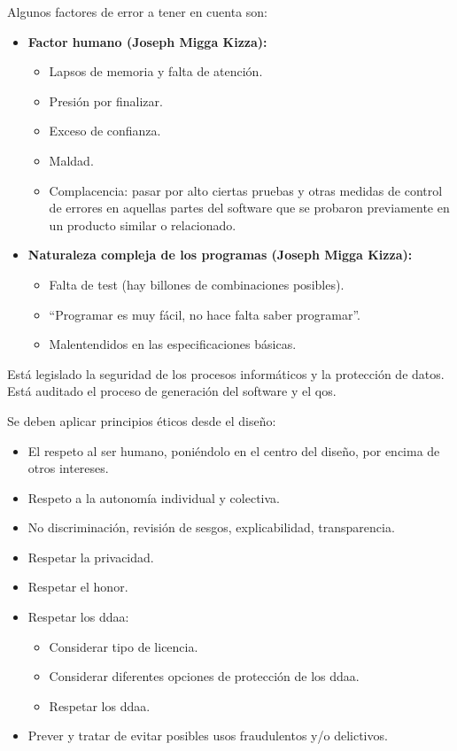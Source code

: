 Algunos factores de error a tener en cuenta son:
\begin{itemize}
    \item\textbf{Factor humano (Joseph Migga Kizza):}
    \begin{itemize}
        \item Lapsos de memoria y falta de atención.
        \item Presión por finalizar.
        \item Exceso de confianza.
        \item Maldad.
        \item Complacencia: pasar por alto ciertas pruebas y otras medidas de control de errores en aquellas partes del software que se probaron previamente en un producto similar o relacionado.
    \end{itemize}
    \item\textbf{Naturaleza compleja de los programas (Joseph Migga Kizza):}
    \begin{itemize}
        \item Falta de test (hay billones de combinaciones posibles).
        \item ``Programar es muy fácil, no hace falta saber programar''.
        \item Malentendidos en las especificaciones básicas.
    \end{itemize}
\end{itemize}

Está legislado la seguridad de los procesos informáticos y la protección de datos. Está auditado el proceso de generación del software y el \gls{qos}.

Se deben aplicar principios éticos desde el diseño:
\begin{itemize}
    \item El respeto al ser humano, poniéndolo en el centro del diseño, por encima de otros intereses.
    \item Respeto a la autonomía individual y colectiva.
    \item No discriminación, revisión de sesgos, explicabilidad, transparencia.
    \item Respetar la privacidad.
    \item Respetar el honor.
    \item Respetar los \gls{ddaa}:
          \begin{itemize}
              \item Considerar tipo de licencia.
              \item Considerar diferentes opciones de protección de los \gls{ddaa}.
              \item Respetar los \gls{ddaa}.
          \end{itemize}
    \item Prever y tratar de evitar posibles usos fraudulentos y/o delictivos.
\end{itemize}



